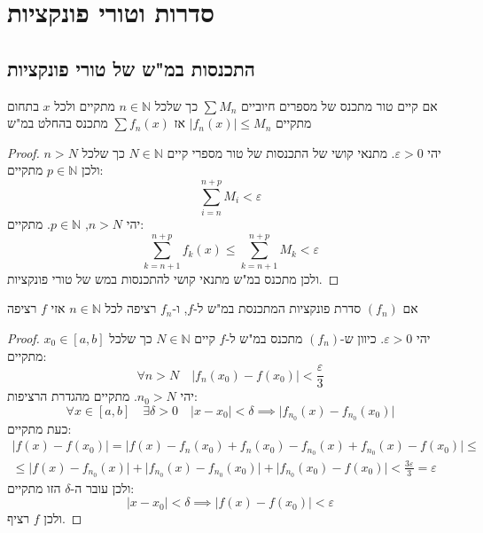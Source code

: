 \documentclass{tstextbook}
\begin{document}
\section{סדרות וטורי פונקציות}

\subsection{התכנסות במ"ש של טורי פונקציות}

\begin{proposition}
אם קיים טור מתכנס של מספרים חיוביים \(\sum M_n\) כך שלכל \(n\in \mathbb N\) מתקיים ולכל \(x\) בתחום מתקיים \(|f_n(x)|\leq M_n\) אז \(\sum f_n(x)\) מתכנס בהחלט במ"ש

\end{proposition}
\begin{proof}
יהי \(\varepsilon>0\). מתנאי קושי של התכנסות של טור מספרי קיים \(N \in \mathbb{N}\) כך שלכל \(n > N\) ולכן \(p \in \mathbb{N}\) מתקיים:
$$\sum_{i=n}^{n+p} M_{i}<\varepsilon$$
יהי \(n>N\), \(p \in \mathbb{N}\). מתקיים:
$$\sum_{k=n+1}^{n+p}f_{k}(x)\leq \sum_{k=n+1}^{n+p} M_{k}<\varepsilon$$
ולכן מתכנס במ"ש מתנאי קושי להתכנסות במש של טורי פונקציות.

\end{proof}
\begin{proposition}
אם \((f_{n})\) סדרת פונקציות המתכנסת במ"ש ל-\(f\), ו-\(f_{n}\) רציפה לכל \(n\in \mathbb{N}\) אזי \(f\) רציפה

\end{proposition}
\begin{proof}
יהי \(\varepsilon>0\). כיוון ש-\((f_{n})\) מתכנס במ"ש ל-\(f\) קיים \(N \in \mathbb{N}\) כך שלכל \(x_{0} \in [a,b]\) מתקיים:
$$\forall n > N\quad \lvert f_{n}(x_{0})-f(x_{0}) \rvert <\frac{\varepsilon}{3}$$
יהי \(n_{0}>N\). מתקיים מהגדרת הרציפות:
$$\forall x \in [a,b]\quad \exists \delta> 0\quad \lvert x-x_{0} \rvert <\delta\implies \lvert f_{n_{0}}(x)-f_{n_{0}}(x_{0}) \rvert $$
כעת מתקיים:
$$\begin{gather}\lvert f(x)-f(x_{0}) \rvert =\lvert f(x)-f_{n}(x_{0})+f_{n}(x_{0})-f_{n_{0}}(x)+f_{n_{0}}(x)-f(x_{0}) \rvert \leq \\\leq \lvert f(x)-f_{n_{0}}(x) \rvert +\lvert f_{n_{0}}(x)-f_{n_{0}}(x_{0}) \rvert +\lvert f_{n_{0}}(x_{0})-f(x_{0}) \rvert <\frac{3\varepsilon}{3}=\varepsilon 
\end{gather}$$
ולכן עובר ה-\(\delta\) הזו מתקיים:
$$\lvert x-x_{0} \rvert <\delta\implies \lvert f(x)-f(x_{0}) \rvert <\varepsilon$$
ולכן \(f\) רציף.

\end{proof}
\end{document}
